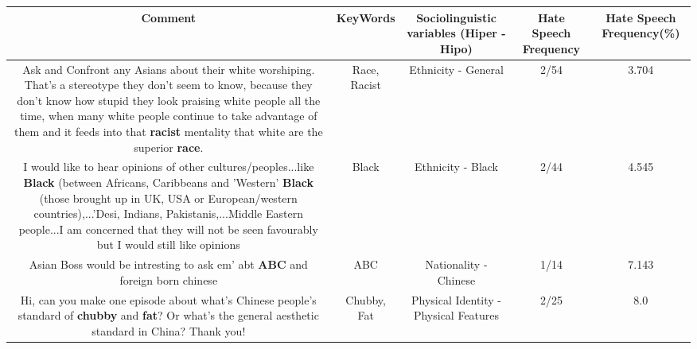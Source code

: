 \documentclass[11pt]{article}
\newlength\mylength
\begin{document}
\begin{center}
\setlength\mylength{\dimexpr\textwidth - 1\arrayrulewidth - 50\tabcolsep}
\begin{longtable}{|C{.65\mylength}|C{.30\mylength}|C{.12\mylength}|C{.12\mylength}|C{.12\mylength}|}
\hline
\textbf{Comment} & \textbf{KeyWords} & \textbf{Sociolinguistic variables (Hiper - Hipo)}  & \textbf{Hate Speech Frequency} & \textbf{Hate Speech Frequency(\%)} \\
\hline{}\small Ask and Confront any Asians about their white worshiping. That's a stereotype they don't seem to know, because they don't know how stupid they look praising white people all the time, when many white people continue to take advantage of them and it feeds into that \textbf{racist} mentality that white are the superior \textbf{race}.\normalsize   & Race, Racist & Ethnicity - General & 2/54 & 3.704 \\  \hline
  \small I would like to hear opinions of other cultures/peoples...like \textbf{Black} (between Africans, Caribbeans and 'Western' \textbf{Black} (those brought up in UK, USA or European/western countries),...'Desi, Indians, Pakistanis,...Middle Eastern people...I am concerned that they will not be seen favourably but I would still like opinions\normalsize   & Black & Ethnicity - Black & 2/44 & 4.545 \\  \hline
  \small Asian Boss would be intresting to ask em' abt \textbf{ABC} and foreign born chinese\normalsize   & ABC & Nationality - Chinese & 1/14 & 7.143 \\  \hline
  \small Hi, can you make one episode about what's Chinese people's standard of \textbf{chubby} and \textbf{fat}? Or what's the general aesthetic standard in China? Thank you!\normalsize   & Chubby, Fat & Physical Identity - Physical Features & 2/25 & 8.0 \\  \hline

\end{longtable}
\end{center}
\end{document}

